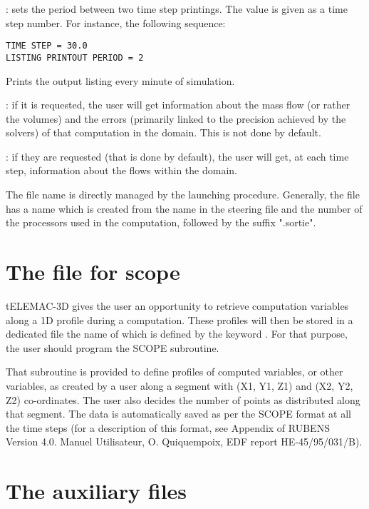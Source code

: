 : sets the period between two time step
printings. The value is given as a time step number. For instance, the
following sequence:

\begin{lstlisting}[language=TelemacCas]
TIME STEP = 30.0
LISTING PRINTOUT PERIOD = 2
\end{lstlisting}

Prints the output listing every minute of simulation.

: if it is requested, the user will get
information about the mass flow (or rather the volumes) and the errors
(primarily linked to the precision achieved by the solvers) of that computation
in the domain. This is not done by default.

: if they are
requested (that is done by default), the user will get, at each time step,
information about the flows within the domain.

The file name is directly managed by the  launching procedure.
Generally, the file has a name which is created from the name in the steering
file and the number of the processors used in the computation, followed by the
suffix ".sortie".

\section{The file for scope}

tELEMAC-3D gives the user an opportunity to retrieve computation variables
along a 1D profile during a computation. These profiles will then be stored in
a dedicated file the name of which is defined by the keyword . For that purpose, the user should program the SCOPE subroutine.

That subroutine is provided to define profiles of computed variables, or other
variables, as created by a user along a segment with (X1, Y1, Z1) and (X2, Y2,
Z2) co-ordinates. The user also decides the number of points as distributed
along that segment. The data is automatically saved as per the SCOPE format at
all the time steps (for a description of this format, see Appendix of RUBENS
Version 4.0. Manuel Utilisateur, O. Quiquempoix, EDF report HE-45/95/031/B).

\section{The auxiliary files}

